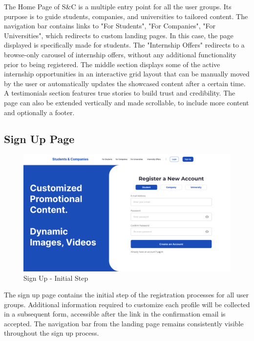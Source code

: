 The Home Page of S\&C is a multiple entry point for all the user groups. Its purpose is to guide students, companies, and universities to tailored content.
The navigation bar contains links to "For Students", "For Companies", "For Universities", which redirects to custom landing pages. In this case, the page displayed is specifically made for students.
The "Internship Offers" redirects to a browse-only carousel of internship offers, without any additional functionality prior to being registered.
The middle section displays some of the active internship opportunities in an interactive grid layout that can be manually moved by the user or automatically updates the showcased content after a certain time.
A testimonials section features true stories to build trust and credibility.
The page can also be extended vertically and made scrollable, to include more content and optionally a footer.

\subsection{Sign Up Page}
\label{subsec: sign_up_page}

\begin{figure} [H]
    \begin{center}
        \includegraphics[width=0.9\linewidth]{LaTeXCode/images/UI/Sign Up - Unified Version.png}
        \caption{Sign Up - Initial Step}
        \label{fig: sign_up_unified}
    \end{center}
\end{figure}

The sign up page contains the initial step of the registration processes for all user groups. Additional information required to customize each profile will be collected in a subsequent form, accessible after the link in the confirmation email is accepted.
The navigation bar from the landing page remains consistently visible throughout the sign up process.

